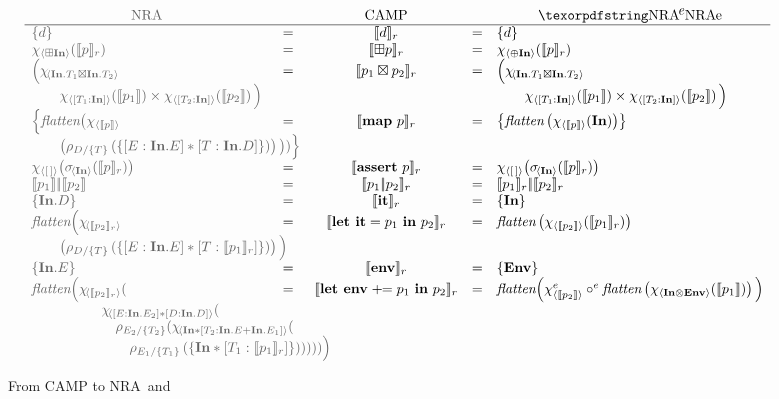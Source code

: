 \begin{figure*}[b]
  \centering
  \[\begin{array}{>{\color{darkergray}}lcccll}
\multicolumn{1}{c}{\color{darkergray}\text{NRA}} && \text{CAMP} && \multicolumn{1}{c}{\text{\NRAEnv}}\\
\hline
\{d\}&=&\pton{d}&=&\{d\}\\
\qmap{\opunop \qID}{\pton{p}}&=&\pton{\opunop p}&=&\qmap{\oplus \qID}{\pton{p}}\\
\Big(\chi\!_{\left\langle{\qID.T_1 \opbinop \qID.T_2}\right\rangle}&=&\pton{p_1 \opbinop p_2}&=&\Big(\chi\!_{\left\langle{\qID.T_1 \opbinop \qID.T_2}\right\rangle}\\
\qquad\qmap{[T_1:\qID]}{\ntop{p_1}}\times \qmap{[T_2:\qID]}{\ntop{p_2}}\Big)&&&&\qquad\qmap{[T_1:\qID]}{\ntop{p_1}}\times \qmap{[T_2:\qID]}{\ntop{p_2}}\Big)\\
\Big\{\opflatten\big(\chi_{\left\langle{\ntop{p}}\right\rangle}&=&\pton{\rmap{p} }&=&\left\{\opflatten\left(\qmap{\ntop{p}}{\qID}\right)\right\}\\
\multicolumn{2}{l}{\color{darkergray}\qquad\left({\quntwo{T}{D}{\{[E:\qID.E]*[T:\qID.D]\}}}\right)\big))\Big\}}\\
\qmap{[\,]}{\qselect{\qID}{\pton{p}}}&=&\pton{\rassert{p}}&=&\qmap{[\,]}{\qselect{\qID}{\pton{p}}}\\
\ntop{p_1}\qor\ntop{p_2}&=&\pton{ p_1\ror p_2}&=&\pton{p_1}\qor\pton{p_2}\\
\{\qID.D\}&=&\pton{\rit}&=&\{\qID\}\\
\opflatten\Big(\chi\!_{\left\langle\pton{p_2}\right\rangle}&=&\pton{\rleti{p_1}{p_2}}&=&\opflatten\left(\qmap{\ntop{p_2}}{\pton{p_1}}\right)\\
\multicolumn{2}{l}{\color{darkergray}\qquad \left({\quntwo{T}{D}{\{[E:\qID.E]*[T:\pton{p_1}]\}}}\right)\Big)}\\
\{\qID.E\}&=&\pton{\renv}&=&\{\qENV\}\\
\opflatten\Big(\chi\!_{\left\langle\pton{p_2}\right\rangle}(&=&\pton{\rlete{p_1}{p_2}}&=&\opflatten\Big(\qmapenv{\ntop{p_2}} \circ^e \opflatten\left(\qmap{\qID \opmergeconcat \qENV}{\ntop{p_1}}\right)\Big)\\
\multicolumn{4}{l}{\color{darkergray}\qquad\qquad\quad\chi\!_{\left\langle[E:\qID.E_2]*[D:\qID.D]\right\rangle}(}\\
\multicolumn{4}{l}{\color{darkergray}\qquad\qquad\qquad\quntwoop{T_2}{E_2}
(
\chi\!_{\left\langle\qID*[T_2:\qID.E+\qID.E_1]\right\rangle}
(}\\
\multicolumn{4}{l}{\color{darkergray}\qquad\qquad\qquad\quad\quntwo{T_1}{E_1}
{
 \{
\qID*[T_1:\pton{p_1}]
\}
}
)
)))\Big)}
\end{array}\]
\caption{From CAMP {\color{darkergray}to NRA\, and} \NRAEnv\, }
  \label{fig:tonraenv-trans}
\end{figure*}

